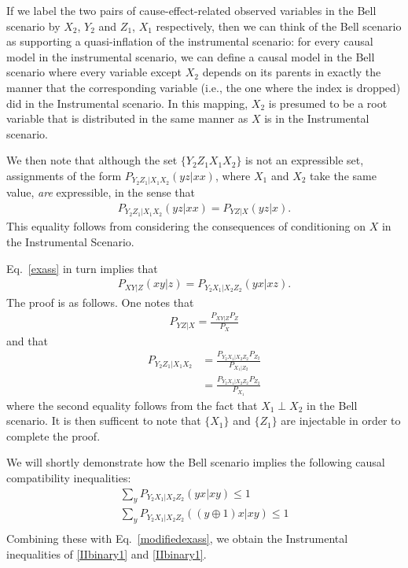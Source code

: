 \documentclass[aps,english,superscriptaddress,onecolumn,twoside,longbibliography,pra,floatfix,fleqn,notitlepage,nofootinbib]{revtex4-1}
\theoremstyle{definition}
\begin{document}
If we label the two pairs of cause-effect-related observed variables in the Bell scenario by $X_2$, $Y_2$ and $Z_1$, $X_1$ respectively, then we can think of the Bell scenario as supporting a quasi-inflation of the instrumental scenario: for every causal model in the instrumental scenario, we can define a causal model in the Bell scenario where every variable except $X_2$ depends on its parents in exactly the manner that the corresponding variable (i.e., the one where the index is dropped) did in the Instrumental scenario.  In this mapping, $X_2$ is presumed to be a root variable that is distributed in the same manner as $X$ is in the Instrumental scenario.  

We then note that although the set $\{ Y_2 Z_1 X_1 X_2\}$ is not an expressible set, assignments of the form $P_{Y_2 Z_1 |X_1 X_2} (yz|xx)$, where $X_1$ and $X_2$ take the same value, {\em are} expressible, in the sense that
\begin{align}
P_{Y_2 Z_1 |X_1 X_2} (yz|xx)= P_{YZ|X}(yz|x).\label{exass}
\end{align}
This equality follows from considering the consequences of conditioning on $X$ in the Instrumental Scenario.

Eq.~\eqref{exass}  in turn implies that
\begin{align}
P_{XY|Z}(xy|z) = P_{Y_2 X_1 |X_2 Z_2} (yx|xz).\label{modifiedexass}
\end{align}
The proof is as follows.  One notes that 
\begin{align}
P_{YZ|X} =\frac{P_{XY|Z} P_Z }{P_X}
\end{align}
and that
\begin{align}
P_{Y_2 Z_1 |X_1 X_2} &= \frac{P_{Y_2 X_1 |X_2 Z_2} P_{Z_2}}{P_{X_1|Z_2}}\nonumber\\
&= \frac{P_{Y_2 X_1 |X_2 Z_2} P_{Z_2}}{P_{X_1}}
\end{align}
where the second equality follows from the fact that $X_1 \perp X_2$ in the Bell scenario.  It is then sufficent to note that $\{X_1\}$ and $\{ Z_1\}$ are injectable in order to complete the proof.

We will shortly demonstrate how the Bell scenario implies the following causal compatibility inequalities:
\begin{align}
\sum_y P_{Y_2 X_1 |X_2 Z_2} (yx|xy) \le 1\label{BGAI}\\
\sum_y P_{Y_2 X_1 |X_2 Z_2} ((y\oplus 1) x|xy) \le 1\label{BGNAI}\\
\end{align}
Combining these with Eq.~\eqref{modifiedexass}, we obtain the Instrumental inequalities of \eqref{IIbinary1} and \eqref{IIbinary1}.  
\end{document}
